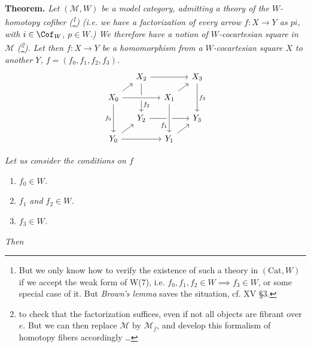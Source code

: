 \setcounter{footnote}{136}
\textbf{Theorem.} \textit{Let $(\mathcal{M}, W)$ be a model category, admitting a theory of the $W$-homotopy cofiber \textup{(}\footnote{But we only know how to verify the existence of such a theory in $(\mathrm{Cat}, W)$ if we accept the weak form of W(7), i.e. $f_0, f_1, f_2 \in W \implies f_3 \in W$, or some special case of it. But \textit{Brown's lemma} saves the situation, cf. XV \S3.}\textup{)} (i.e. we have a factorization of every arrow $f : X \longrightarrow Y$ as $pi$, with $i \in \Cof_W$, $p \in W$.) We therefore have a notion of $W$-cocartesian square in $\mathcal{M}$ \textup{(}\footnote{to check that the factorization suffices, even if not all objects are fibrant over $e$. But we can then replace $\mathcal{M}$ by $\mathcal{M}_f$, and develop this formalism of homotopy fibers accordingly \dots}\textup{)}. Let
then $f : X \longrightarrow Y$ be a homomorphism from a $W$-cocartesian square $X$ to another $Y$, $f = (f_0, f_1, f_2, f_3)$.}
\[
\begin{tikzcd}[ampersand replacement=\&, column sep=small, row sep=small]
 \& X_2 \arrow[rr] \arrow[dd, "f_2" near end] \& \& X_3 \arrow[dd, "f_3"] \\
X_0 \arrow[ur] \arrow[rr, crossing over] \arrow[dd, "f_0"'] \& \& X_1 \arrow[ur] \& \\
 \& Y_2 \arrow[rr] \& \& Y_3 \\
Y_0 \arrow[ur] \arrow[rr] \& \& Y_1 \arrow[ur] \arrow[from=uu, crossing over, "f_1"' near end] \&
\end{tikzcd}
\]

\textit{Let us consider the conditions on $f$}

\begin{enumerate}
\item[\textit{a)}] \textit{$f_0 \in W$.}
\item[\textit{b)}] \textit{$f_1$ and $f_2 \in W$.}
\item[\textit{c)}] \textit{$f_3 \in W$.}
\end{enumerate}

\textit{Then}

